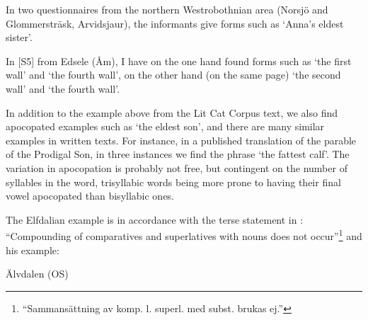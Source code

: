 
In two questionnaires from the northern Westrobothnian area (Norsjö and Glommersträsk, Arvidsjaur), the informants give forms such as  ‘Anna’s eldest sister’.


In [S5] from Edsele (Åm), I have on the one hand found forms such as  ‘the first wall’ and ‘the fourth wall’, on the other hand (on the same page)  ‘the second wall’ and ‘the fourth wall’.


In addition to the example above from the Lit Cat Corpus text, we also find apocopated examples such as  ‘the eldest son’, and there are many similar examples in written texts. For instance, in a published translation of the parable of the Prodigal Son, in three instances we find the phrase  ‘the fattest calf’. The variation in apocopation is probably not free, but contingent on the number of syllables in the word, trisyllabic words being more prone to having their final vowel apocopated than bisyllabic ones. 


The Elfdalian example is in accordance with the terse statement in \citet[57]{Levander1909}: “Compounding of comparatives and superlatives with nouns does not occur”\footnote{ “Sammansättning av komp. l. superl. med subst. brukas ej.”} and his example:


\item 

Älvdalen (OS)

